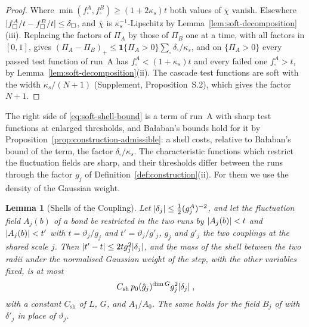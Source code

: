 \documentclass[11pt]{preprint}
\DeclarePairedDelimiter{\abs}{\lvert}{\rvert}
\numberwithin{equation}{section}
\newtheorem{lemma}[theorem]{Lemma}
\theoremstyle{definition}
\theoremstyle{remark}
\theoremstyle{plain}
\begin{document}
\begin{proof}
Where $\min(f^A_\square, f^B_\square) \geq (1 + 2\kappa_s)t$ both values of $\bar\chi$ vanish. Elsewhere $\abs{f^A_\square/t - f^B_\square/t} \leq \delta_\square$, and $\bar\chi$ is $\kappa_s^{-1}$-Lipschitz by Lemma~\ref{lem:soft-decomposition}(iii). Replacing the factors of $\Pi_A$ by those of $\Pi_B$ one at a time, with all factors in $[0, 1]$, gives $(\Pi_A - \Pi_B)_+ \leq \mathbf 1\{\Pi_A > 0\}\sum_\square\delta_\square/\kappa_s$, and on $\{\Pi_A > 0\}$ every passed test function of run~A has $f^A_\square < (1 + \kappa_s)t$ and every failed one $f^A_\square > t$, by Lemma~\ref{lem:soft-decomposition}(ii). The cascade test functions are soft with the width $\kappa_s/(N + 1)$ (Supplement, Proposition~S.2), which gives the factor $N + 1$.
\end{proof}

The right side of \eqref{eq:soft-shell-bound} is a term of run~A with sharp test functions at enlarged thresholds, and Ba{\l}aban's bounds hold for it by Proposition~\ref{prop:construction-admissible}: a shell costs, relative to Ba{\l}aban's bound of the term, the factor $\delta_\square/\kappa_s$. The characteristic functions which restrict the fluctuation fields are sharp, and their thresholds differ between the runs through the factor $g_j$ of Definition~\ref{def:construction}(ii). For them we use the density of the Gaussian weight.

\begin{lemma}[Shells of the Coupling]\label{lem:coupling-shells}
Let $\abs{\delta_j} \leq \frac12(g^A_j)^{-2}$, and let the fluctuation field $A_j(b)$ of a bond be restricted in the two runs by $\abs{A_j(b)} < t$ and $\abs{A_j(b)} < t'$ with $t = \vartheta_j/g_j$ and $t' = \vartheta_j/g'_j$, $g_j$ and $g'_j$ the two couplings at the shared scale $j$. Then $\abs{t' - t} \leq 2tg_j^2\abs{\delta_j}$, and the mass of the shell between the two radii under the normalised Gaussian weight of the step, with the other variables fixed, is at most
\begin{equation}\label{eq:coupling-shell}
    C_{\mathrm{sh}}\,p_0(\hat g_j)^{\dim G}g_j^2\abs{\delta_j}\;,
\end{equation}
with a constant $C_{\mathrm{sh}}$ of $L$, $G$, and $A_1/A_0$. The same holds for the field $B_j$ of \cite[(1.55), p.~188]{BalabanLFR1} with $\delta'_j$ in place of $\vartheta_j$.
\end{lemma}
\end{document}
